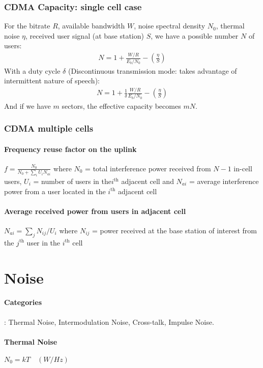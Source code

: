 \documentclass[6pt]{scrartcl}
\begin{document}
\begin{multicols}{4}
\subsubsection{CDMA Capacity: single cell case}
For the bitrate $R$, available bandwidth $W$, noise spectral density $N_0$, thermal noise $\eta$, received user signal (at base station) $S$, we have a possible number $N$ of users:
\begin{align*}
	N = 1 + \frac{W/R}{E_b/N_0} - (\frac{\eta}{S})
\end{align*}
With a duty cycle $\delta$ (Discontinuous transmission mode: takes advantage of
intermittent nature of speech):
\begin{align*}
	N = 1 + \frac1\delta\frac{W/R}{E_b/N_0} - (\frac{\eta}{S})
\end{align*}
And if we have $m$ sectors, the effective capacity becomes $mN$.
\subsubsection{CDMA multiple cells}
\paragraph{Frequency reuse factor on the uplink} 
$f = \frac{N_0}{N_0 + \sum_iU_iN_{ai}}$ where $N_0$ = total interference power received from $N-1$ in-cell users, $U_i$ = number of users in the$i^\text{th}$ adjacent cell and $N_{ai}$ = average interference power from a user located in the $i^\text{th}$ adjacent cell

\paragraph{Average received power from users in adjacent cell}
$N_{ai} = \sum_j N_{ij}/U_i$ where $N_{ij}$ = power received at the base station of interest from the $j^\text{th}$ user in the $i^\text{th}$ cell

\section{Noise}
\paragraph{Categories}: Thermal Noise, Intermodulation Noise, Cross-talk, Impulse Noise.
\paragraph{Thermal Noise}$N_0 = kT\quad(W/Hz)$


\end{multicols}
\end{document}
